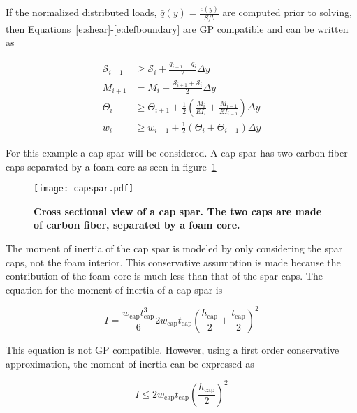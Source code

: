 \documentclass[]{aiaa-tc}%
\begin{document}
If the normalized distributed loads, $\bar{q}(y) = \frac{c(y)}{S/b}$ are computed prior to solving, then Equations~\ref{e:shear}-\ref{e:defboundary} are GP compatible and can be written as

\begin{align}
    \label{e:sheargp}
    \mathcal{S}_{i+1} &\geq \mathcal{S}_i + \frac{q_{i+1} + q_i}{2} \Delta y \\
    \label{e:momentgp}
    M_{i+1} &= M_i + \frac{\mathcal{S}_{i+1} + \mathcal{S}_i}{2} \Delta y \\
    \label{e:anglegp}
    \Theta_{i} &\geq \Theta_{i+1} + \frac{1}{2} \left(\frac{M_i}{EI_i} + \frac{M_{i-1}}{EI_{i-1}} \right) \Delta y \\
    \label{e:deflection}
    w_{i} &\geq w_{i+1} + \frac{1}{2} (\Theta_i + \Theta_{i-1}) \Delta y 
\end{align}

For this example a cap spar will be considered.  A cap spar has two carbon fiber caps separated by a foam core as seen in figure~\ref{f:capspar}

\begin{figure}[H]
	\begin{center}
	\texttt{[image: capspar.pdf]}
    \caption{ \textbf{ Cross sectional view of a cap spar.  The two caps are made of carbon fiber, separated by a foam core.}}
	\label{f:capspar}
	\end{center}
\end{figure}

The moment of inertia of the cap spar is modeled by only considering the spar caps, not the foam interior.  
This conservative assumption is made because the contribution of the foam core is much less than that of the spar caps.  
The equation for the moment of inertia\cite{bending} of a cap spar is 

\begin{equation}
    \label{e:moispar}
    I = \frac{w_{\text{cap}}t_{\text{cap}}^3}{6} 2w_{\text{cap}}t_{\text{cap}}\left( \frac{h_{\text{cap}}}{2} + \frac{t_{\text{cap}}}{2} \right)^2
\end{equation}

This equation is not GP compatible.  However, using a first order conservative approximation, the moment of inertia can be expressed as

\begin{equation}
    \label{e:moispar}
    I \leq 2w_{\text{cap}}t_{\text{cap}}\left(\frac{h_{\text{cap}}}{2}\right)^2
\end{equation}
\end{document}
